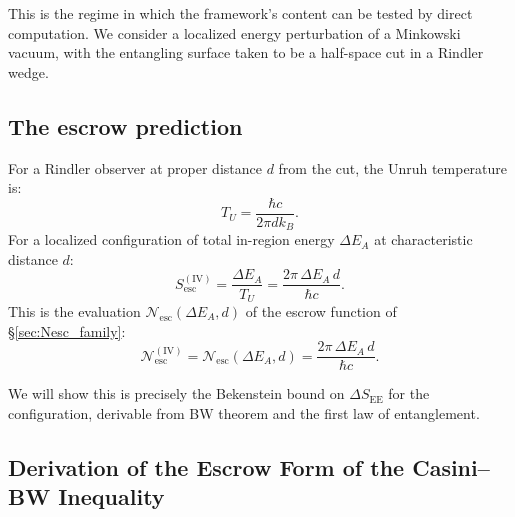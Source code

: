 \documentclass[11pt]{article}
\begin{document}
This is the regime in which the framework's content can be tested by direct computation. We consider a localized energy perturbation of a Minkowski vacuum, with the entangling surface taken to be a half-space cut in a Rindler wedge.

\subsection{The escrow prediction}

For a Rindler observer at proper distance $d$ from the cut, the Unruh temperature is:
\begin{equation}
T_U = \frac{\hbar c}{2\pi d k_B}.
\end{equation}
For a localized configuration of total in-region energy $\Delta E_A$ at characteristic distance $d$:
\begin{equation}
S_{\mathrm{esc}}^{\mathrm{(IV)}} = \frac{\Delta E_A}{T_U} = \frac{2\pi \, \Delta E_A \, d}{\hbar c}.
\label{eq:Sesc_IV}
\end{equation}
This is the evaluation $\mathcal{N}_{\mathrm{esc}}(\Delta E_A, d)$ of the escrow function of \S\ref{sec:Nesc_family}:
\begin{equation}
\mathcal{N}_{\mathrm{esc}}^{\mathrm{(IV)}} = \mathcal{N}_{\mathrm{esc}}(\Delta E_A, d) = \frac{2\pi \, \Delta E_A \, d}{\hbar c}.
\label{eq:Nesc_IV}
\end{equation}

We will show this is precisely the Bekenstein bound on $\Delta S_{\mathrm{EE}}$ for the configuration, derivable from BW theorem and the first law of entanglement.

\subsection{Derivation of the Escrow Form of the Casini--BW Inequality}
\end{document}
